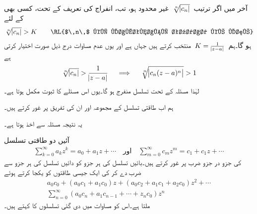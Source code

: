 آخر میں اگر ترتیب 
$\,\sqrt[\leftroot{-2}n]{\abs{c_n}}\,$
غیر محدود ہو، تب، انفراج کی تعریف کے تحت، کسی بھی  کے لئے
\begin{align*}
\sqrt[\leftroot{-2}n]{\abs{c_n}}>K\quad\quad \text{\RL{$\,n\,$ کی لامتناہی تعداد کے لئے}}
\end{align*}
ہو گا۔ہم 
$\,K=\tfrac{1}{\abs{z-a}}\,$
منتخب کرتے ہیں جہاں  ہے اور یوں عدم مساوات درج ذیل صورت اختیار کرتی ہے
\begin{align*}
\sqrt[\leftroot{-2}n]{\abs{c_n}}>\frac{1}{\abs{z-a}} \quad \implies \quad \sqrt[\leftroot{-2}n]{\abs{c_n(z-a)^n}}>1
\end{align*}
لہٰذا مسئلہ  کے تحت تسلسل منفرج ہو گا۔یوں اس مسئلے کا ثبوت مکمل ہوتا ہے۔

ہم اب طاقتی تسلسل کے مجموعہ اور ان کی تفریق پر غور کرتے ہیں۔

  یہ نتیجہ مسئلہ  سے اخذ ہوتا ہے۔

آئیں دو طاقتی تسلسل 
\begin{align}\label{مساوات_ٹیلر_کوشی_حاصل_ضرب_الف}
\sum_{k=0}^{\infty} a_kz^k=a_0+a_1z+\cdots\quad \text{اور}\quad \sum_{m=0}^{\infty}c_mz^m=c_1+c_1z+\cdots
\end{align}
کی جزو در جزو ضرب پر غور کرتے ہیں۔بائیں تسلسل کی ہر جزو کو دائیں تسلسل  کی ہر جزو سے ضرب دے کر  کی ایک جیسی طاقتوں کو یکجا کرتے ہوئے
\begin{multline}\label{مساوات_ٹیلر_کوشی_حاصل_ضرب_ب}
a_0c_0+(a_0c_1+a_1c_0)z+(a_0c_2+a_1c_1+a_2c_0)z^2+\cdots\\
\sum\limits_{n=0}^{\infty} (a_0c_n+a_1c_{n-1}+\cdots+z_nc_0)z^n
\end{multline}
ملتا ہے۔اس کو مساوات  میں دی گئی تسلسلوں  کا  کہتے ہیں۔

